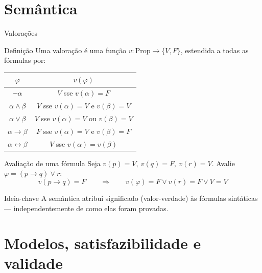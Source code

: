 \documentclass[10pt,aspectratio=169]{beamer}
\newcommand{\dest}[1]{\alert{#1}}
\begin{document}
\section{Semântica}
\begin{frame}{Valorações}
  \begin{block}{Definição}
    Uma \dest{valoração} é uma função $v:\mathrm{Prop}\to\{V,F\}$, estendida a todas as fórmulas por:
  \end{block}
  \begin{center}
    \begin{tabular}{c|c}
      \toprule
      $\varphi$ & $v(\varphi)$ \\
      \midrule
      $\neg\alpha$ & $V$ sse $v(\alpha)=F$\\
      $\alpha\land\beta$ & $V$ sse $v(\alpha)=V$ e $v(\beta)=V$\\
      $\alpha\lor\beta$ & $V$ sse $v(\alpha)=V$ ou $v(\beta)=V$\\
      $\alpha\rightarrow\beta$ & $F$ sse $v(\alpha)=V$ e $v(\beta)=F$\\
      $\alpha\leftrightarrow\beta$ & $V$ sse $v(\alpha)=v(\beta)$\\
      \bottomrule
    \end{tabular}\par
  \end{center}
\end{frame}

\begin{frame}{Avaliação de uma fórmula}
  Seja $v(p)=V,\ v(q)=F,\ v(r)=V$. Avalie $\varphi = (p\rightarrow q)\lor r$:
  \[
    v(p\rightarrow q) = F \qquad\Rightarrow\qquad v(\varphi) = F \lor v(r) = F\lor V = V
  \]
  \begin{alertblock}{Ideia-chave}
    A semântica atribui \dest{significado} (valor-verdade) às fórmulas sintáticas — independentemente de como elas foram provadas.
  \end{alertblock}
\end{frame}

\section{Modelos, satisfazibilidade e validade}
\end{document}
